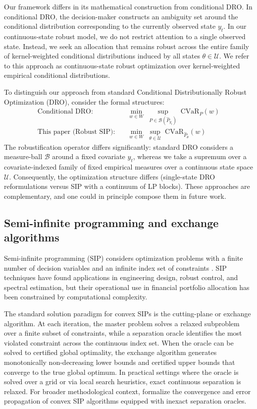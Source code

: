 \documentclass[smallextended]{svjour3}
\begin{document}
Our framework differs in its mathematical construction from conditional DRO. In conditional DRO, the decision-maker constructs an ambiguity set around the conditional distribution corresponding to the currently observed state $y_t$. In our continuous-state robust model, we do not restrict attention to a single observed state. Instead, we seek an allocation that remains robust across the entire family of kernel-weighted conditional distributions induced by all states $\theta \in \mathcal{U}$. We refer to this approach as continuous-state robust optimization over kernel-weighted empirical conditional distributions.


To distinguish our approach from standard Conditional Distributionally Robust Optimization (DRO), consider the formal structures:
\begin{align}
\text{Conditional DRO:} &\quad \min_{w \in W}\;\sup_{P \in \mathcal{B}(\hat{P}_{y_t})}\; \mathrm{CVaR}_{P}(w) \label{eq:dro_contrast} \\
\text{This paper (Robust SIP):} &\quad \min_{w \in W}\;\sup_{\theta \in \mathcal{U}}\; \mathrm{CVaR}_{\hat{P}_\theta}(w) \label{eq:sip_contrast}
\end{align}
The robustification operator differs significantly: standard DRO considers a measure-ball $\mathcal{B}$ around a fixed covariate $y_t$, whereas we take a supremum over a covariate-indexed family of fixed empirical measures over a continuous state space $\mathcal{U}$. Consequently, the optimization structure differs (single-state DRO reformulations versus SIP with a continuum of LP blocks). These approaches are complementary, and one could in principle compose them in future work.

\subsection{Semi-infinite programming and exchange algorithms}
Semi-infinite programming (SIP) considers optimization problems with a finite number of decision variables and an infinite index set of constraints \citep{hettich1993semi, lopez2007semi}. SIP techniques have found applications in engineering design, robust control, and spectral estimation, but their operational use in financial portfolio allocation has been constrained by computational complexity.

The standard solution paradigm for convex SIPs is the cutting-plane or exchange algorithm. At each iteration, the master problem solves a relaxed subproblem over a finite subset of constraints, while a separation oracle identifies the most violated constraint across the continuous index set. When the oracle can be solved to certified global optimality, the exchange algorithm generates monotonically non-decreasing lower bounds and certified upper bounds that converge to the true global optimum. In practical settings where the oracle is solved over a grid or via local search heuristics, exact continuous separation is relaxed. For broader methodological context, \citet{oustry2025convex} formalize the convergence and error propagation of convex SIP algorithms equipped with inexact separation oracles.
\end{document}
